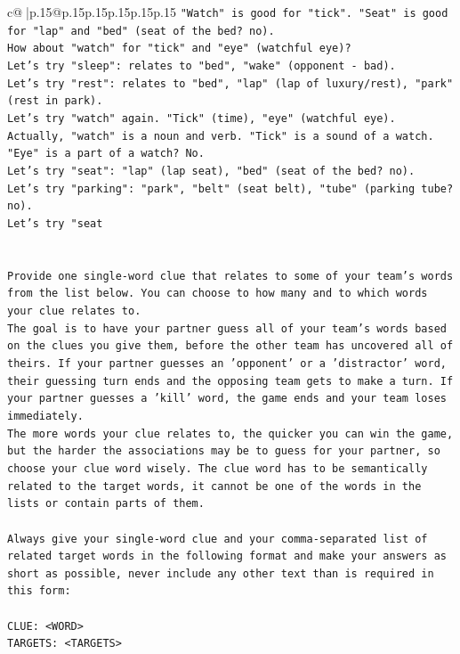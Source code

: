 \documentclass{article}
\begin{document}
{\begin{supertabular}{c@{$\;$}|p{.15\linewidth}@{}p{.15\linewidth}p{.15\linewidth}p{.15\linewidth}p{.15\linewidth}p{.15\linewidth}}
{{{\texttt{"Watch" is good for "tick". "Seat" is good for "lap" and "bed" (seat of the bed? no).} \\
\texttt{How about "watch" for "tick" and "eye" (watchful eye)?} \\
\texttt{Let's try "sleep": relates to "bed", "wake" (opponent {-} bad).} \\
\texttt{Let's try "rest": relates to "bed", "lap" (lap of luxury/rest), "park" (rest in park).} \\
\texttt{Let's try "watch" again. "Tick" (time), "eye" (watchful eye).} \\
\texttt{Actually, "watch" is a noun and verb. "Tick" is a sound of a watch. "Eye" is a part of a watch? No.} \\
\texttt{Let's try "seat": "lap" (lap seat), "bed" (seat of the bed? no).} \\
\texttt{Let's try "parking": "park", "belt" (seat belt), "tube" (parking tube? no).} \\
\texttt{Let's try "seat} \\
\\ 
\\ 
\texttt{Provide one single{-}word clue that relates to some of your team's words from the list below. You can choose to how many and to which words your clue relates to.} \\
\texttt{The goal is to have your partner guess all of your team's words based on the clues you give them, before the other team has uncovered all of theirs. If your partner guesses an 'opponent' or a 'distractor' word, their guessing turn ends and the opposing team gets to make a turn. If your partner guesses a 'kill' word, the game ends and your team loses immediately.} \\
\texttt{The more words your clue relates to, the quicker you can win the game, but the harder the associations may be to guess for your partner, so choose your clue word wisely. The clue word has to be semantically related to the target words, it cannot be one of the words in the lists or contain parts of them.} \\
\\ 
\texttt{Always give your single{-}word clue and your comma{-}separated list of related target words in the following format and make your answers as short as possible, never include any other text than is required in this form:} \\
\\ 
\texttt{CLUE: <WORD>} \\
\texttt{TARGETS: <TARGETS>} \\
}}}
\end{supertabular}}
\end{document}

